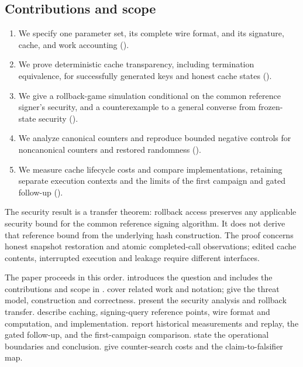 \documentclass[a4paper,envcountsame,runningheads]{llncs}
\begin{document}
\subsection{Contributions and scope}\label{sec:scope}

\begin{enumerate}
\item[\textbf{C1.}] We specify one parameter set, its complete wire format, and its signature, cache, and work accounting ().
\item[\textbf{C2.}] We prove deterministic cache transparency, including termination equivalence, for successfully generated keys and honest cache states ().
\item[\textbf{C3.}] We give a rollback-game simulation conditional on the common reference signer's security, and a counterexample to a general converse from frozen-state security ().
\item[\textbf{C4.}] We analyze canonical counters and reproduce bounded negative controls for noncanonical counters and restored randomness ().
\item[\textbf{C5.}] We measure cache lifecycle costs and compare implementations, retaining separate execution contexts and the limits of the first campaign and gated follow-up ().
\end{enumerate}

The security result is a transfer theorem: rollback access preserves any applicable security bound for the common reference signing algorithm. It does not derive that reference bound from the underlying hash construction. The proof concerns honest snapshot restoration and atomic completed-call observations; edited cache contents, interrupted execution and leakage require different interfaces.

The paper proceeds in this order.  introduces the question and includes the contributions and scope in .  cover related work and notation;  give the threat model, construction and correctness.  present the security analysis and rollback transfer.  describe caching, signing-query reference points, wire format and computation, and implementation.  report historical measurements and replay, the gated follow-up, and the first-campaign comparison.  state the operational boundaries and conclusion.  give counter-search costs and the claim-to-falsifier map.
\end{document}
